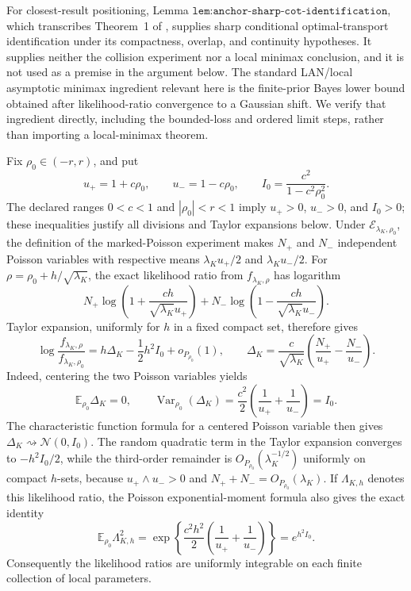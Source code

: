 For closest-result positioning, Lemma
\(\texttt{lem:anchor-sharp-cot-identification}\), which transcribes
Theorem~1 of \cite{linGaoBlanchetGlynn2026Causal}, supplies sharp
conditional optimal-transport identification under its compactness,
overlap, and continuity hypotheses.  It supplies neither the collision
experiment nor a local minimax conclusion, and it is not used as a
premise in the argument below.  The standard LAN/local asymptotic
minimax ingredient relevant here is the finite-prior Bayes lower bound
obtained after likelihood-ratio convergence to a Gaussian shift.  We
verify that ingredient directly, including the bounded-loss and ordered
limit steps, rather than importing a local-minimax theorem.

Fix \(\rho_0\in(-r,r)\), and put
\[
 u_+=1+c\rho_0,\qquad
 u_-=1-c\rho_0,\qquad
 I_0=\frac{c^2}{1-c^2\rho_0^2}.
 \tag{70}
\]
The declared ranges \(0<c<1\) and \(|\rho_0|<r<1\) imply
\(u_+>0\), \(u_->0\), and \(I_0>0\); these inequalities justify all
divisions and Taylor expansions below.  Under
\(\mathcal E_{\lambda_K,\rho_0}\), the definition of the marked-Poisson
experiment makes \(N_+\) and \(N_-\) independent Poisson variables
with respective means \(\lambda_Ku_+/2\) and
\(\lambda_Ku_-/2\).  For
\(\rho=\rho_0+h/\sqrt{\lambda_K}\), the exact likelihood ratio from
\(f_{\lambda_K,\rho}\) has logarithm
\[
 N_+\log\!\left(1+\frac{ch}{\sqrt{\lambda_K}u_+}\right)
 +N_-\log\!\left(1-\frac{ch}{\sqrt{\lambda_K}u_-}\right).
\]
Taylor expansion, uniformly for \(h\) in a fixed compact set, therefore
gives
\[
 \log\frac{f_{\lambda_K,\rho}}
 {f_{\lambda_K,\rho_0}}
 =h\Delta_K-\frac12h^2I_0+o_{P_{\rho_0}}(1),
 \qquad
 \Delta_K=\frac c{\sqrt{\lambda_K}}
 \left(\frac{N_+}{u_+}-\frac{N_-}{u_-}\right).
 \tag{71}
\]
Indeed, centering the two Poisson variables yields
\[
 \mathbb E_{\rho_0}\Delta_K=0,
 \qquad
 \operatorname{Var}_{\rho_0}(\Delta_K)
 =\frac{c^2}{2}\left(\frac1{u_+}+\frac1{u_-}\right)
 =I_0.
 \tag{72}
\]
The characteristic function formula for a centered Poisson variable
then gives \(\Delta_K\rightsquigarrow\mathcal N(0,I_0)\).  The random
quadratic term in the Taylor expansion converges to
\(-h^2I_0/2\), while the third-order remainder is
\(O_{P_{\rho_0}}(\lambda_K^{-1/2})\) uniformly on compact
\(h\)-sets, because \(u_+\wedge u_->0\) and
\(N_++N_-=O_{P_{\rho_0}}(\lambda_K)\).  If
\(\Lambda_{K,h}\) denotes this likelihood ratio, the Poisson
exponential-moment formula also gives the exact identity
\[
 \mathbb E_{\rho_0}\Lambda_{K,h}^2
 =\exp\!\left\{
 \frac{c^2h^2}{2}
 \left(\frac1{u_+}+\frac1{u_-}\right)\right\}
 =e^{h^2I_0}.
 \tag{73}
\]
Consequently the likelihood ratios are uniformly integrable on each
finite collection of local parameters.

